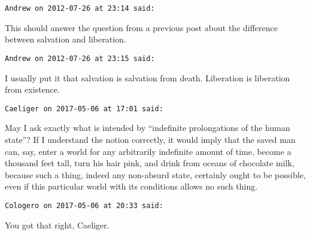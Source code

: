 \begin{footnotesize}\begin{sffamily}



\texttt{Andrew on 2012-07-26 at 23:14 said: }

This should answer the question from a previous post about the difference between salvation and liberation.


\hfill

\texttt{Andrew on 2012-07-26 at 23:15 said: }

I usually put it that salvation is salvation from death. Liberation is liberation from existence.


\hfill

\texttt{Caeliger on 2017-05-06 at 17:01 said: }

May I ask exactly what is intended by “indefinite prolongations of the human state”? If I understand the notion correctly, it would imply that the saved man can, say, enter a world for any arbitrarily indefinite amount of time, become a thousand feet tall, turn his hair pink, and drink from oceans of chocolate milk, because such a thing, indeed any non-absurd state, certainly ought to be possible, even if this particular world with its conditions allows no such thing.


\hfill

\texttt{Cologero on 2017-05-06 at 20:33 said: }

You got that right, Caeliger.


\end{sffamily}\end{footnotesize}
